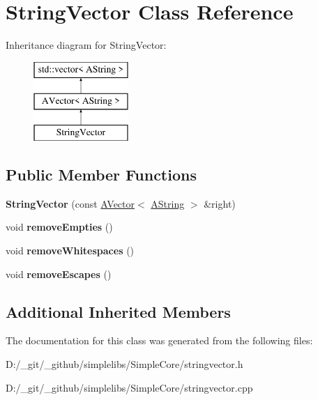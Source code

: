 \hypertarget{class_string_vector}{}\section{String\+Vector Class Reference}
\label{class_string_vector}
Inheritance diagram for String\+Vector\+:\begin{figure}[H]
\begin{center}
\leavevmode
\includegraphics[height=3.000000cm]{class_string_vector}
\end{center}
\end{figure}
\subsection*{Public Member Functions}
\begin{DoxyCompactItemize}
\item 
\mbox{\label{class_string_vector_a2ca60b8a045a3fabbf5f1cc2b6948cf5}} 
{\bfseries String\+Vector} (const \mbox{\hyperlink{class_a_vector}{A\+Vector}}$<$ \mbox{\hyperlink{class_a_string}{A\+String}} $>$ \&right)
\item 
\mbox{\label{class_string_vector_aa12fb0e9769a4f3903f7b97aca3b45f9}} 
void {\bfseries remove\+Empties} ()
\item 
\mbox{\label{class_string_vector_a9723199c06d3a1396aff0663d9ff7218}} 
void {\bfseries remove\+Whitespaces} ()
\item 
\mbox{\label{class_string_vector_a7c39c268480229a8dbd7dea9ba5f33a8}} 
void {\bfseries remove\+Escapes} ()
\end{DoxyCompactItemize}
\subsection*{Additional Inherited Members}


The documentation for this class was generated from the following files\+:\begin{DoxyCompactItemize}
\item 
D\+:/\+\_\+git/\+\_\+github/simplelibs/\+Simple\+Core/stringvector.\+h\item 
D\+:/\+\_\+git/\+\_\+github/simplelibs/\+Simple\+Core/stringvector.\+cpp\end{DoxyCompactItemize}
